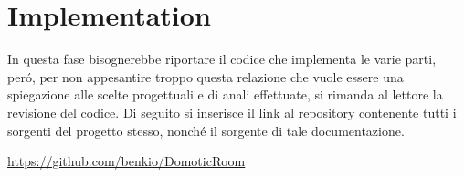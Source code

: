 \section{Implementation}

In questa fase bisognerebbe riportare il codice che implementa le varie parti, per\'o, per non appesantire troppo questa relazione che vuole essere una spiegazione alle scelte progettuali e di anali effettuate, si rimanda al lettore la revisione del codice. Di seguito si inserisce il link al repository contenente tutti i sorgenti del progetto stesso, nonch\'e il sorgente di tale documentazione.

\url{https://github.com/benkio/DomoticRoom}
